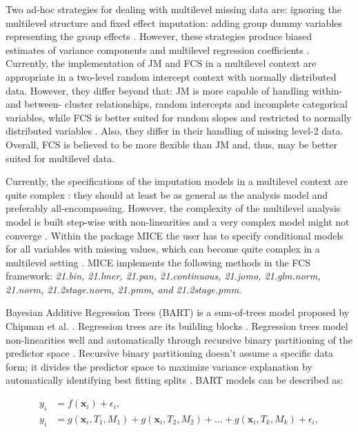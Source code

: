 \documentclass[10pt, a4paper, titlepage]{article}
\begin{document}
Two ad-hoc strategies for dealing with multilevel missing data are: ignoring the multilevel structure and fixed effect imputation: adding group dummy variables representing the group effects \citep{ludtke2017, enders2016}. However, these strategies produce biased estimates of variance components and multilevel regression coefficients \citep{ludtke2017}. Currently, the implementation of JM and FCS in a multilevel context are appropriate in a two-level random intercept context with normally distributed data. However, they differ beyond that: JM is more capable of handling within- and between- cluster relationships, random intercepts and incomplete categorical variables, while FCS is better suited for random slopes and restricted to normally distributed variables \citep{enders2016}. Also, they differ in their handling of missing level-2 data. Overall, FCS is believed to be more flexible than JM \citep{audigier2018} and, thus, may be better suited for multilevel data.

Currently, the specifications of the imputation models in a multilevel context are quite complex \citep{buurenFlexibleImputationMissing2018}: they should at least be as general as the analysis model \citep{grund2018} and preferably all-encompassing. However, the complexity of the multilevel analysis model is built step-wise with non-linearities \citep{hox2017} and a very complex model might not converge \citep{buurenFlexibleImputationMissing2018}. Within the package MICE \citep{buuren2011} the user has to specify conditional models for all variables with missing values, which can become quite complex in a multilevel setting \citep{buurenFlexibleImputationMissing2018, burgette2010}. MICE implements the following methods in the FCS framework: \textit{21.bin, 21.lmer, 21.pan, 21.continuous, 21.jomo, 21.glm.norm, 21.norm, 21.2stage.norm, 21.pmm, and 21.2stage.pmm}.

Bayesian Additive Regression Trees (BART) is a sum-of-trees model proposed by Chipman et al. \citep{chipman2010}. Regression trees are its building blocks \citep{chipman2010, hill2020, james2021}. Regression trees model non-linearities well and automatically through recursive binary partitioning of the predictor space \citep{hill2020, burgette2010}. Recursive binary partitioning doesn't assume a specific data form; it divides the predictor space to maximize variance explanation by automatically identifying best fitting splits \citep{hastie2017, james2021, salditt2023}. BART models can be described as:

\begin{subequations}
\label{eq:BART}
\begin{align}
y_i &= f(\textbf{x}_i) + \epsilon_i, \tag{1.1} \\
y_i &= g(\textbf{x}_{i}, T_{1}, M_{1})+ g(\textbf{x}_{i}, T_{2}, M_{2}) + \dots + g(\textbf{x}_{i}, T_{k}, M_{k}) + \epsilon_i, \tag{1.2}
\end{align}
\end{subequations}
\end{document}

